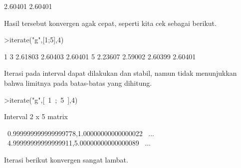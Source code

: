 \documentclass[12pt,arial,letterpaper]{book}
\begin{document}
\begin{eulernootebook}
\begin{eulercomment}
\begin{eulercomment}
\begin{eulernootebook}
\begin{eulercomment}
\begin{eulercomment}
\begin{eulercomment}
\begin{eulercomment}
\begin{eulercomment}
\begin{eulercomment}
\begin{eulernotebook}
\begin{eulercomment}
\begin{eulercomment}
\begin{eulercomment}
\begin{eulercomment}
\begin{eulercomment}
\begin{eulercomment}
\begin{eulercomment}
\begin{eulercomment}
\begin{eulercomment}
\begin{eulercomment}
\begin{eulercomment}
\begin{eulercomment}
\begin{eulercomment}
\begin{eulercomment}
\begin{eulercomment}
\begin{eulercomment}
\begin{eulercomment}
\begin{eulercomment}
\begin{eulercomment}
\begin{eulercomment}
\begin{eulercomment}
\begin{eulercomment}
\begin{eulercomment}
\begin{eulercomment}
\begin{eulercomment}
\begin{eulercomment}
\begin{eulercomment}
\begin{eulercomment}
\begin{eulercomment}
\begin{eulercomment}
\begin{euleroutput}
        2.60401 
        2.60401 
\end{euleroutput}
\begin{eulercomment}
Hasil tersebut konvergen agak cepat, seperti kita cek sebagai berikut.
\end{eulercomment}
\begin{eulerprompt}
>iterate("g",[1;5],4)
\end{eulerprompt}
\begin{euleroutput}
              1             3       2.61803       2.60403       2.60401 
              5       2.23607       2.59002       2.60399       2.60401 
\end{euleroutput}
\begin{eulercomment}
Iterasi pada interval dapat dilakukan dan stabil, namun tidak
menunjukkan bahwa limitnya pada batas-batas yang dihitung.
\end{eulercomment}
\begin{eulerprompt}
>iterate("g",[~1~;~5~],4)
\end{eulerprompt}
\begin{euleroutput}
  Interval 2 x 5 matrix
  
  ~0.999999999999999778,1.00000000000000022~     ...
  ~4.99999999999999911,5.00000000000000089~     ...
\end{euleroutput}
\begin{eulercomment}
Iterasi berikut konvergen sangat lambat.


\end{eulercomment}
\end{eulercomment}
\end{eulercomment}
\end{eulercomment}
\end{eulercomment}
\end{eulercomment}
\end{eulercomment}
\end{eulercomment}
\end{eulercomment}
\end{eulercomment}
\end{eulercomment}
\end{eulercomment}
\end{eulercomment}
\end{eulercomment}
\end{eulercomment}
\end{eulercomment}
\end{eulercomment}
\end{eulercomment}
\end{eulercomment}
\end{eulercomment}
\end{eulercomment}
\end{eulercomment}
\end{eulercomment}
\end{eulercomment}
\end{eulercomment}
\end{eulercomment}
\end{eulercomment}
\end{eulercomment}
\end{eulercomment}
\end{eulercomment}
\end{eulercomment}
\end{eulernotebook}
\end{eulercomment}
\end{eulercomment}
\end{eulercomment}
\end{eulercomment}
\end{eulercomment}
\end{eulercomment}
\end{eulernootebook}
\end{eulercomment}
\end{eulercomment}
\end{eulernootebook}
\end{document}
